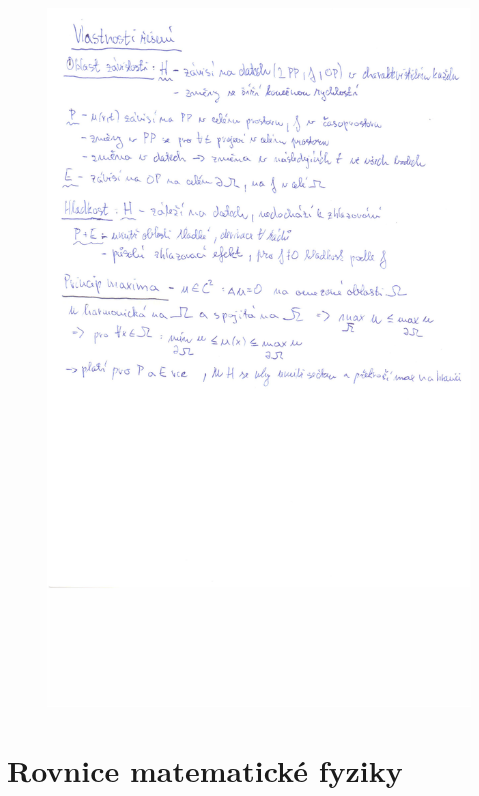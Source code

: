 \documentclass[a4]{report}
\theoremstyle{definition}
\begin{document}
\begin{figure}[H]
\includegraphics[width=\textwidth]{2-6b.jpg}
\end{figure}


\section{Rovnice matematické fyziky}
\end{document}
